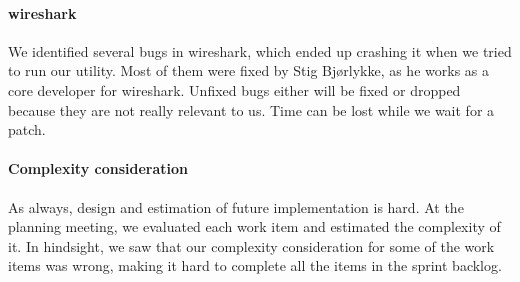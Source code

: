 \paragraph{\Gls{wireshark}} 
We identified several bugs in \Gls{wireshark}, which ended up crashing it when we tried to run our \gls{utility}. Most of them were fixed by Stig Bjørlykke, as he works as a core developer for \Gls{wireshark}. Unfixed bugs either will be fixed or dropped because they are not really relevant to us. Time can be lost while we wait for a patch.

\paragraph{Complexity consideration}
As always, design and estimation of future implementation is hard. At the planning meeting, we evaluated each work item and estimated the complexity of it. In hindsight, we saw that our complexity consideration for some of the work items was wrong, making it hard to complete all the items in the sprint backlog.

